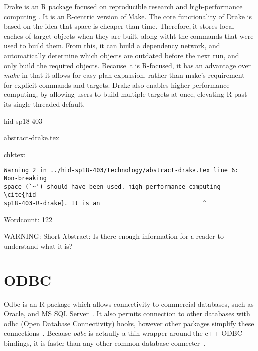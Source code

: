 Drake is an R package focused on reproducible research and
high-performance computing \cite{hid-sp18-403-R-drake}. It is an
R-centric version of Make. The core functionality of Drake is based on
the idea that space is cheaper than time.  Therefore, it stores local
caches of target objects when they are built, along witht the commands
that were used to build them. From this, it can build a dependency
network, and automatically determine which objects are outdated before
the next run, and only build the required objects. Because it is
R-focused, it has an advantage over \textit{make} in that it allows
for easy plan expansion, rather than make’s requirement for explicit
commands and targets.  Drake also enables higher performance
computing, by allowing users to build multiple targets at once,
elevating R past its single threaded default.


\begin{IU}

hid-sp18-403

\href{https://github.com/cloudmesh-community/hid-sp18-403/blob/master//technology/abstract-drake.tex}{abstract-drake.tex}

 
chktex:
\begin{tiny}
\begin{verbatim}
Warning 2 in ../hid-sp18-403/technology/abstract-drake.tex line 6: Non-breaking
space (`~') should have been used. high-performance computing \cite{hid-
sp18-403-R-drake}. It is an                             ^
\end{verbatim}
\end{tiny}

Wordcount: 122

WARNING: Short Abstract: Is there enough information for a reader to understand what it is?

\end{IU}

\section{ODBC}

Odbc is an R package which allows connectivity to commercial
databases, such as Oracle, and MS SQL
Server~\cite{hid-sp18-403-R-odbc}. It also permits connection to other
databases with odbc  (Open Database Connectivity) hooks, however other
packages simplify these connections~\cite{hid-sp18-403-R-dbi}.
Because \textit{odbc} is actaully a thin wrapper around the c++ ODBC
bindings, it is faster than any other common database
connecter~\cite{hid-sp18-403-rstudio-odbc}.


